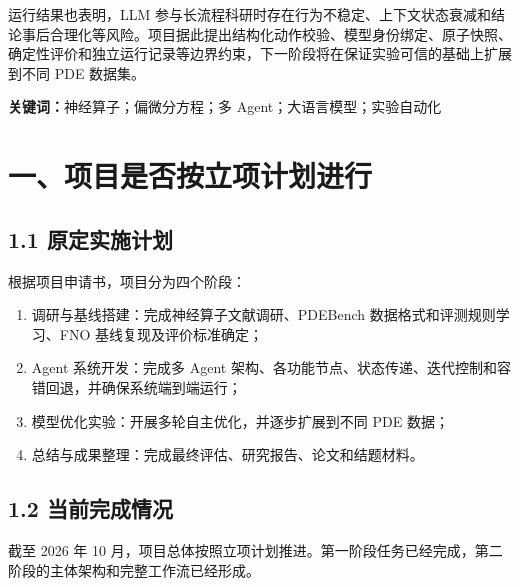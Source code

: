 \documentclass[UTF8,a4paper,zihao=-4]{ctexart}
\begin{document}
运行结果也表明，LLM 参与长流程科研时存在行为不稳定、上下文状态衰减和结论事后合理化等风险。项目据此提出结构化动作校验、模型身份绑定、原子快照、确定性评价和独立运行记录等边界约束，下一阶段将在保证实验可信的基础上扩展到不同 PDE 数据集。

\textbf{关键词：}神经算子；偏微分方程；多 Agent；大语言模型；实验自动化

\section*{一、项目是否按立项计划进行}

\subsection*{1.1 原定实施计划}

根据项目申请书，项目分为四个阶段：

\begin{enumerate}[leftmargin=2em]
\item 调研与基线搭建：完成神经算子文献调研、PDEBench 数据格式和评测规则学习、FNO 基线复现及评价标准确定；
\item Agent 系统开发：完成多 Agent 架构、各功能节点、状态传递、迭代控制和容错回退，并确保系统端到端运行；
\item 模型优化实验：开展多轮自主优化，并逐步扩展到不同 PDE 数据；
\item 总结与成果整理：完成最终评估、研究报告、论文和结题材料。
\end{enumerate}

\subsection*{1.2 当前完成情况}

截至 2026 年 10 月，项目总体按照立项计划推进。第一阶段任务已经完成，第二阶段的主体架构和完整工作流已经形成。
\end{document}
